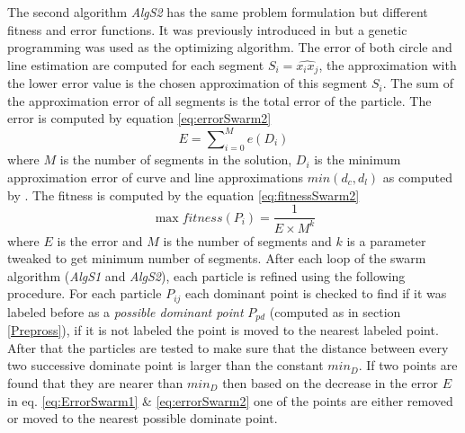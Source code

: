 \documentclass[a4paper,10pt]{IEEEconf}
\begin{document}
The second algorithm \textsl{AlgS2} has the same problem formulation but different fitness and error functions. It was previously introduced in \cite{CruveDivisionSwarm} but a genetic programming was used as the optimizing algorithm.  The error of both circle and line estimation are computed for each segment $S_i=\widehat{x_ix_j}$, the approximation with the lower error value is the chosen approximation of this segment $S_i$. The sum of the approximation error of all segments is the total error of the particle.  The error is computed by equation \ref{eq:errorSwarm2} \begin{equation}
E=\sum\nolimits_{i = 0}^M e(D_i) 
\label{eq:errorSwarm2}
\end{equation}where $M$ is the number of segments in the solution, $D_i$ is the minimum approximation error of curve and line approximations $min(d_c,d_l)$ as computed by \cite{CruveDivisionSwarm}.  The fitness is computed by the equation \ref{eq:fitnessSwarm2} \begin{equation}
\max fitness(P_i ) = \frac{1}{{E \times M^k }}
\label{eq:fitnessSwarm2}
\end{equation} where $E$ is the error and $M$ is the number of segments and $k$ is a parameter tweaked to get minimum number of segments. 
After each loop of the swarm algorithm (\textsl{AlgS1} and \textsl{AlgS2}), each particle is refined using the following procedure. For each particle $P_{ij}$ %
each dominant point is checked to find if it was labeled before as a \textit{possible dominant point} $P_{pd}$ (computed as in section \ref{Prepross}), if it is not labeled the point is moved to the nearest labeled point. After that the particles are tested to make sure that the distance between every two successive dominate point is larger than the constant $min_D$. If two points are found that they are nearer than $min_D$ then based on the decrease in the error $E$ in eq. \ref{eq:ErrorSwarm1} \& \ref{eq:errorSwarm2} one of the points are either removed or moved to the nearest possible dominate point. 
\end{document}
